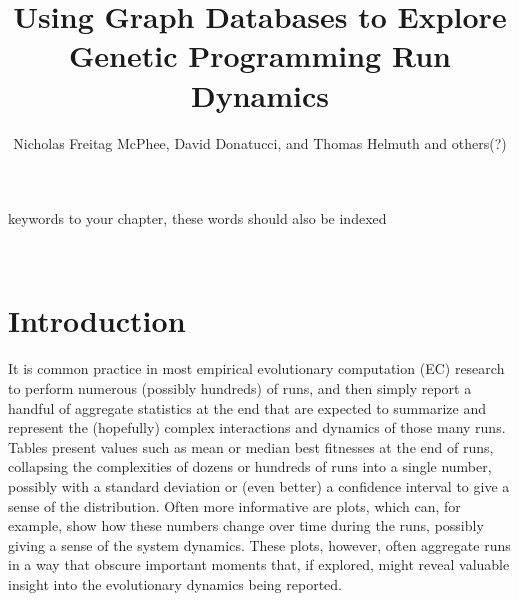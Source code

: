 %


\title*{Using Graph Databases to Explore Genetic Programming Run Dynamics}
\author{Nicholas Freitag McPhee, David Donatucci, and Thomas Helmuth and others(?)}

\maketitle


\begin{keywords}
keywords to your chapter, these words should also be indexed
\end{keywords}
\\

\section{Introduction}
\label{sec:introduction}

It is common practice in most empirical evolutionary computation (EC) 
research to perform numerous (possibly hundreds) of runs, and then simply 
report a handful of aggregate statistics at the end that are expected to summarize and represent 
the (hopefully) complex interactions and dynamics of those many runs. Tables present values such 
as mean or median best fitnesses at the end of runs, collapsing the complexities of dozens or 
hundreds of runs into a single number, possibly with a standard deviation or (even better) a 
confidence interval to give a sense of the distribution. Often more informative are plots, which can, 
for example, show how these numbers change over time during the runs, possibly giving a sense of 
the system dynamics. These plots, however, often aggregate runs in a way that obscure important 
moments that, if explored, might reveal valuable insight into the evolutionary dynamics being 
reported.

